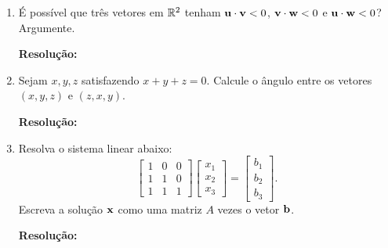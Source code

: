 \documentclass[leqno]{article}
\numberwithin{equation}{section}
\newenvironment{sol}
{
    \vspace{4mm}
    \noindent\textbf{Resolução:}
    \strut\newline
    \smallskip
    \hspace{-3.5mm}
}
{}
\begin{document}
\begin{enumerate}
\begin{center}
\end{center} 

\begin{sol} 
\end{sol} 

\item É possível que três vetores em $\mathbb{R}^2$ tenham $\mathbf{u} \cdot \mathbf{v} < 0$, $\mathbf{v} \cdot \mathbf{w} < 0$ e $\mathbf{u} \cdot \mathbf{w} < 0$? Argumente.

\begin{sol} 
\end{sol} 

\item Sejam $x,y,z$ satisfazendo $x + y + z = 0$. Calcule o ângulo entre os vetores $(x,y,z)$ e $(z,x,y)$.

\begin{sol} 
\end{sol} 

\item Resolva o sistema linear abaixo:
$$\begin{bmatrix}
1 & 0 & 0\\
1 & 1 & 0\\
1 & 1 & 1
\end{bmatrix} \begin{bmatrix}
x_1\\
x_2\\
x_3
\end{bmatrix} = \begin{bmatrix}
b_1\\
b_2\\
b_3
\end{bmatrix}.$$
Escreva a solução $\mathbf{x}$ como uma matriz $A$ vezes o vetor $\mathbf{b}$.

\begin{sol} 
\end{sol} 


\end{enumerate}
\end{document}
